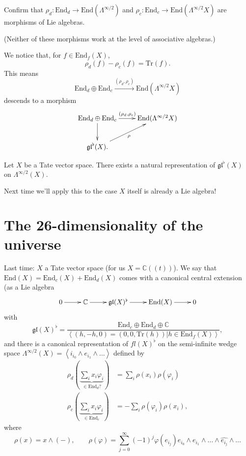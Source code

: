 \begin{exercise}
\label{exercise-representation-of-end}
Confirm that $\rho_d: \text{End}_d \to
\text{End}(\Lambda^{\infty/2})$
and $\rho_c:\text{End}_c \to
\text{End}(\Lambda^{\infty/2}X)$
are morphisms of Lie algebras.
\end{exercise}

\noindent
(Neither of these morphisms work at the
level of associative algebras.)

\medskip\noindent
We notice that,
for $f \in \text{End}_f(X)$,
$$
\rho_d(f)-\rho_c(f)=\text{Tr}(f).
$$
This means
$$
\text{End}_d \oplus \text{End}_c
\xrightarrow{(\rho_d,\rho_c)}
\text{End}(\Lambda^{\infty/2}X)
$$
descends to a morphism
$$
\xymatrix{
\text{End}_d \oplus
\text{End}_c\ar[r]^{(\rho_d,\rho_c)}\ar[d]
&\text{End}(\Lambda^{\infty/2}X)\\
\mathfrak{gl}^\flat (X).\ar[ur]_\rho
}
$$

\begin{theorem}
\label{theorem-tate}
Let $X$ be a Tate vector space.
There exists a natural representation
of $\mathfrak{gl}^\flat(X)$ on
$\Lambda^{\infty/2}(X)$.
\end{theorem}

\noindent
Next time we'll apply this to the case
$X$ itself is already a Lie algebra!

\section{The 26-dimensionality of the
universe}
\label{section-26-dimensionality-universe}

Last time: $X$ a Tate vector space (for us
$X=\mathbb{C}((t))$).
We say that
$\text{End}(X)=\text{End}_c(X)+\text{End}
_d(X)$
comes with a canonical central extension
(as a Lie algebra
$$
\xymatrix{
0\ar[r]&\mathbb{C}\ar[r]&
\mathfrak{gl}(X)^\flat\ar[r]&
\text{End}(X)\ar[r]&0
}
$$
with
$$
\mathfrak{gl}(X)^\flat=
\frac{\text{End}_c \oplus \text{End}_d \oplus
\mathbb{C}}{
\left\langle{}(h,-h,0)=(0,0,\text{Tr}(h))|h \in
\text{End}_f(X)\right\rangle{}},
$$
and there is a canonical representation of
$fl(X)^\flat$ on the semi-infinite wedge
space
$\Lambda^{\infty/2}(X)=\left\langle{}i_{i_0}\wedge
e_{i_1}\wedge\ldots\right\rangle{}$
defined by
\begin{equation}
\label{equation-rep}
\begin{aligned}
\rho_d(\underbrace{\sum_ix_i\varphi_i}
_{\in\text{End}_d?})&=
\sum_i\rho(x_i)\rho(\varphi_i)\\
\rho_c(\underbrace{\sum_ix_i\varphi_i}_{\in
\text{End}_c})&=
-\sum_i\rho(\varphi_i)\rho(x_i),
\end{aligned}
\end{equation}
where
$$
\rho(x)=x\wedge(-),\qquad
\rho(\varphi)=
\sum_{j=0}^\infty(-1)^j \varphi(e_{i_j})
e_{i_0}\wedge e_{i_1}\wedge \ldots \wedge
\widehat{e_{i_j}}\wedge\ldots
$$


